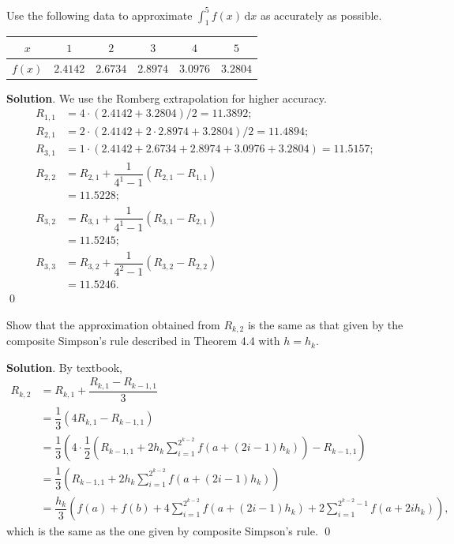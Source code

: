 \documentclass[11pt]{article}
\theoremstyle{break}
\newcommand{\ddi}{\text{$\,$d}}
\numberwithin{equation}{theorem}
\begin{document}
\newpage
\begin{problem}\label{problem 11} %
    Use the following data to approximate $\displaystyle\int_1^5 f(x)\ddi x$ as accurately as possible.
    \begin{center}
        \begin{tabular}{c|c|c|c|c|c}
            $x$ & $1$ & $2$ & $3$ & $4$ & $5$ \\
            \hline
            $f(x)$ & $2.4142$ & $2.6734$ & $2.8974$ & $3.0976$ & $3.2804$
        \end{tabular}
    \end{center}
\end{problem}
\textbf{Solution}. We use the Romberg extrapolation for higher accuracy. \begin{align*}
    R_{1,1}&=4\cdot\left(2.4142+3.2804\right)/2=11.3892;\\
    R_{2,1}&=2\cdot\left(2.4142+2\cdot2.8974+3.2804\right)/2=11.4894;\\
    R_{3,1}&=1\cdot\left(2.4142+2.6734+2.8974+3.0976+3.2804\right)=11.5157;\\
    R_{2,2}&=R_{2,1}+\dfrac{1}{4^1-1}\left(R_{2,1}-R_{1,1}\right)\\
    &=11.5228;\\
    R_{3,2}&=R_{3,1}+\dfrac{1}{4^1-1}\left(R_{3,1}-R_{2,1}\right)\\
    &=11.5245;\\
    R_{3,3}&=R_{3,2}+\dfrac{1}{4^2-1}\left(R_{3,2}-R_{2,2}\right)\\
    &=11.5246.
\end{align*} \qed


\newpage
\begin{problem}\label{problem 12} %
    Show that the approximation obtained from $R_{k,2}$ is the same as that given by the composite Simpson's rule described in Theorem 4.4 with $h=h_k$.
\end{problem}
\textbf{Solution}. By textbook,
\begin{align*}
    R_{k, 2} &= R_{k, 1} + \dfrac{R_{k, 1} - R_{k-1, 1}}{3}\\
    &= \dfrac{1}{3}(4R_{k, 1} - R_{k-1, 1})\\
    &= \dfrac{1}{3}\left(4\cdot \dfrac{1}{2}\left(R_{k-1, 1} + 2h_k\displaystyle\sum_{i=1}^{2^{k-2}} f(a+(2i-1)h_k)\right) - R_{k-1, 1}\right)\\
    &= \dfrac{1}{3}\left(R_{k-1, 1} + 2h_k\displaystyle\sum_{i=1}^{2^{k-2}} f(a+(2i-1)h_k)\right)\\
    &= \dfrac{h_k}{3}\left(f(a) + f(b) + 4\displaystyle\sum_{i=1}^{2^{k-2}} f(a+(2i-1)h_k) + 2\displaystyle\sum_{i=1}^{2^{k-2}-1} f(a+2ih_k)\right),
\end{align*}
which is the same as the one given by composite Simpson's rule. \qed
\end{document}
